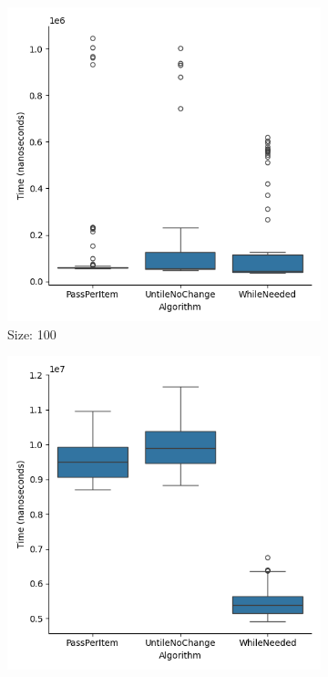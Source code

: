 \documentclass{article}
\begin{document}
\begin{figure}[ht]
  \centering
  \begin{subfigure}{0.3\textwidth}
    \centering
    \includegraphics[width=\linewidth]{../figureByte100.png}
    \caption{Size: 100}
    \label{fig:img1}
  \end{subfigure}
  \begin{subfigure}{0.3\textwidth}
    \centering
    \includegraphics[width=\linewidth]{../figureByte1000.png}

\end{subfigure}
\end{figure}
\end{document}
